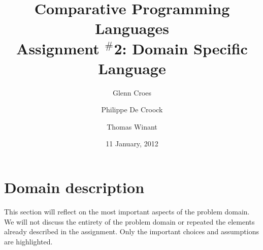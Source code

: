 \documentclass[a4paper]{article}
\begin{document}

\title{Comparative Programming Languages\\
Assignment $^{\#}$2: Domain Specific Language}
\author{Glenn Croes \and Philippe De Croock \and Thomas Winant}
\date{11 January, 2012}

\maketitle

\tableofcontents

\clearpage
\section{Domain description}
\label{sec:domain-description}




This section will reflect on the most important aspects of the problem domain.
We will not discuss the entirety of the problem domain or repeated the elements already described in the assignment.
Only the important choices and assumptions are highlighted.
\end{document}
